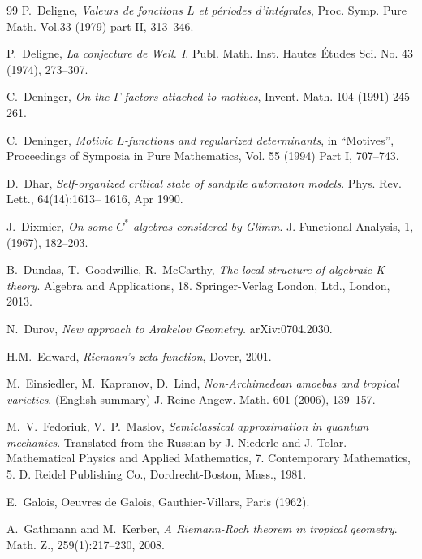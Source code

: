 \documentclass[12pt]{article}
\begin{document}
\begin{thebibliography}{99}
 P.~Deligne, {\em Valeurs de fonctions $L$ et p\'eriodes
d'int\'egrales}, Proc. Symp. Pure Math. Vol.33 (1979) part II,
313--346.

 P.~Deligne, {\em La conjecture de Weil. I}. Publ. Math.
Inst. Hautes \'Etudes Sci. No. 43 (1974), 273--307.





 C.~Deninger, {\it On the $\Gamma$-factors attached to
motives}, Invent. Math. 104 (1991) 245--261.

 C.~Deninger, {\it Motivic $L$-functions and regularized
determinants}, in ``Motives'', Proceedings of Symposia in Pure
Mathematics, Vol. 55 (1994) Part I, 707--743.


 D.~Dhar, {\em Self-organized critical state of sandpile automaton models}. Phys. Rev. Lett., 64(14):1613--
1616, Apr 1990.

 J.~Dixmier,  {\em On some $C^*$-algebras considered by Glimm}. J. Functional Analysis, 1, (1967), 182--203.


 B.~Dundas, T.~Goodwillie, R.~McCarthy,  {\em The local structure of algebraic K-theory}. Algebra and Applications, 18. Springer-Verlag London, Ltd., London, 2013.

 N.~Durov, {\em New approach to Arakelov Geometry.} arXiv:0704.2030.




  H.M.~Edward, {\em Riemann's zeta function}, Dover,
2001.


 M.~Einsiedler, M.~Kapranov, D.~Lind, {\em
Non-Archimedean amoebas and tropical varieties}. (English summary) 
J. Reine Angew. Math. 601 (2006), 139--157.


 M.~V.~Fedoriuk, V.~P.~Maslov, {\em  Semiclassical approximation in quantum mechanics}. Translated from the Russian by J. Niederle and J. Tolar. Mathematical Physics and Applied Mathematics, 7. Contemporary Mathematics, 5. D. Reidel Publishing Co., Dordrecht-Boston, Mass., 1981.


 E.~Galois, {Oeuvres de Galois}, Gauthier-Villars,
Paris (1962).

 A.~Gathmann and M.~Kerber, {\em A Riemann-Roch theorem in tropical geometry}. Math. Z.,
259(1):217--230, 2008.


\end{thebibliography}
\end{document}
